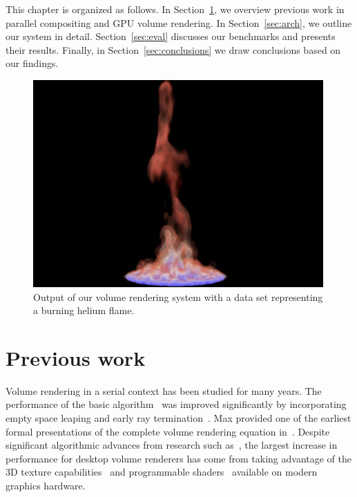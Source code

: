 This chapter is organized as follows.  In Section~\ref{sec:previous},
we overview previous work in parallel compositing and GPU volume
rendering.  In Section~\ref{sec:arch}, we outline our system in detail.
Section~\ref{sec:eval} discusses our benchmarks and presents their
results. Finally, in Section~\ref{sec:conclusions} we draw conclusions
based on our findings.

\begin{figure}
  \includegraphics[width=\linewidth]{images/multiscale/teaser}
  \caption{Output of our volume rendering system with a data set
  representing a burning helium flame.}
  \label{fig:sample}
\end{figure}

\section{Previous work}
\label{sec:previous}

Volume rendering in a serial context has been studied for many years.
The
performance of the basic algorithm~\cite{Needed} was improved
significantly by incorporating empty space leaping and early ray
termination~\cite{Levoy:EarlyTermination}.  Max provided one of the
earliest formal presentations of the complete volume rendering equation
in~\cite{Needed}.  Despite significant algorithmic advances from
research such as~\cite{Levoy:EarlyTermination}, the largest increase in
performance for desktop volume renderers has come from taking advantage
of the 3D texture capabilities~\cite{Needed, Needed, Needed} and
programmable shaders~\cite{Krueger:2003:ATGV} available on modern
graphics hardware.

